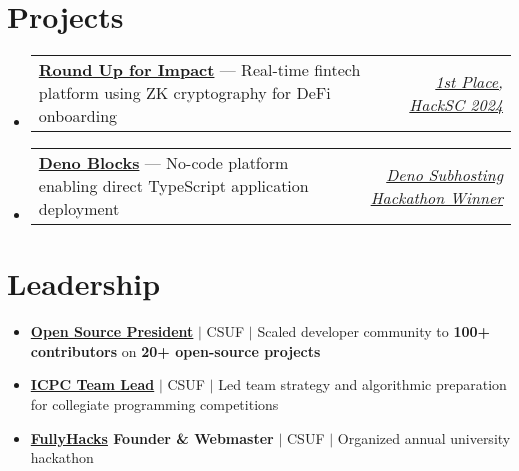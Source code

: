 \documentclass[letterpaper,11pt]{article}
\makeatletter
\newcommand{\resumeItem}[1]{
  \item\small{
    {#1 \vspace{-2pt}}
  }
}
\newcommand{\resumeProjectHeading}[2]{
    \item
    \begin{tabular*}{0.97\textwidth}{l@{\extracolsep{\fill}}r}
      \small#1 & #2 \\
    \end{tabular*}\vspace{-3pt}
}
\newcommand{\resumeSubHeadingListStart}{\begin{itemize}[leftmargin=0.15in, label={}]}
\newcommand{\resumeSubHeadingListEnd}{\end{itemize}}
\makeatother
\begin{document}
\section{Projects}
\resumeSubHeadingListStart
  \resumeProjectHeading
    {\textbf{\href{https://devpost.com/software/rufi}{Round Up for Impact}} --- Real-time fintech platform using ZK cryptography for DeFi onboarding}
    {\emph{\href{https://devpost.com/software/rufi}{1st Place, HackSC 2024}}}
  \resumeProjectHeading
    {\textbf{\href{https://blocks.deno.dev/}{Deno Blocks}} --- No-code platform enabling direct TypeScript application deployment}
    {\emph{\href{https://deno.com/blog/subhosting-hackathon\#winning-submissions}{Deno Subhosting Hackathon Winner}}}
\resumeSubHeadingListEnd

\section{Leadership}
\resumeSubHeadingListStart
  \resumeItem{\textbf{\href{https://github.com/acmcsufoss}{Open Source President}} $|$ CSUF $|$ Scaled developer community to \textbf{100+ contributors} on \textbf{20+ open-source projects}}
  \resumeItem{\textbf{\href{https://acmcsuf.com/blog/322}{ICPC Team Lead}} $|$ CSUF $|$ Led team strategy and algorithmic preparation for collegiate programming competitions}
  \resumeItem{\textbf{\href{https://fullyhacks.acmcsuf.com/}{FullyHacks} Founder \& Webmaster} $|$ CSUF $|$ Organized annual university hackathon}
\resumeSubHeadingListEnd

\end{document}
